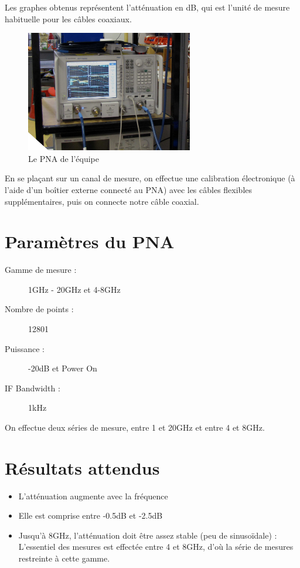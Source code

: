 Les graphes obtenus représentent l'atténuation en dB, qui est l'unité de mesure habituelle pour les câbles coaxiaux.
\begin{figure}[h]
    \begin{center}
        \includegraphics[width=0.65\textwidth]{Images/VNA}
        \caption{Le PNA de l'équipe}
        \label{PNA}
    \end{center}
\end{figure}

En se plaçant sur un canal de mesure, on effectue une calibration électronique (à l'aide d'un boîtier externe connecté au PNA) avec les câbles flexibles supplémentaires, puis on connecte notre câble coaxial.

\newpage
\section{Paramètres du PNA}
\begin{description}
    \item[Gamme de mesure :] 1GHz - 20GHz et 4-8GHz
    \item[Nombre de points :] 12801
    \item[Puissance :] -20dB et Power On
    \item[IF Bandwidth :] 1kHz
\end{description}

On effectue deux séries de mesure, entre 1 et 20GHz et entre 4 et 8GHz.

\section{Résultats attendus}

\begin{itemize}
    \item L'atténuation augmente avec la fréquence
    \item Elle est comprise entre -0.5dB et -2.5dB
    \item Jusqu'à 8GHz, l'atténuation doit être assez stable (peu de sinusoïdale) : L'essentiel des mesures est effectée entre 4 et 8GHz, d'où la série de mesures restreinte à cette gamme.
\end{itemize}

